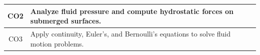 \documentclass[12pt, a4paper]{article}
\begin{document}
\begin{center}
\begin{tabularx}{\textwidth}{|c|X|}
                                                                                                                                                                                                                                                                                                                                                                                                                                                                                                                                                                                                                                                                                    \hline
                                                                                                                                                                                                                                                                                                                                                                                                                                                                                                                                                                                                                                                                                            CO2 & Analyze fluid pressure and compute hydrostatic forces on submerged surfaces. \\
                                                                                                                                                                                                                                                                                                                                                                                                                                                                                                                                                                                                                                                                                                    \hline
                                                                                                                                                                                                                                                                                                                                                                                                                                                                                                                                                                                                                                                                                                            CO3 & Apply continuity, Euler's, and Bernoulli's equations to solve fluid motion problems. \\

\end{tabularx}
\end{center}
\end{document}
